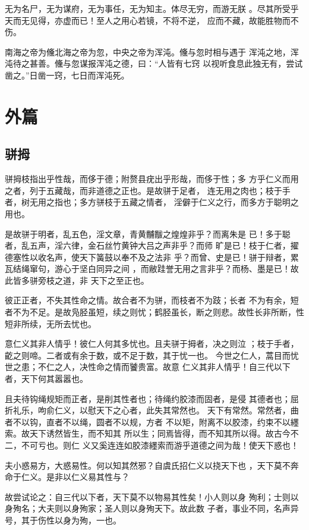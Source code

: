 \documentclass[12pt,UTF8]{ctexbook}
\begin{document}
无为名尸，无为谋府，无为事任，无为知主。体尽无穷，而游无朕 。尽其所受乎天而无见得，亦虚而已！至人之用心若镜，不将不逆， 应而不藏，故能胜物而不伤。

南海之帝为儵北海之帝为忽，中央之帝为浑沌。儵与忽时相与遇于 浑沌之地，浑沌待之甚善。儵与忽谋报浑沌之德，曰：“人皆有七窍 以视听食息此独无有，尝试凿之。”日凿一窍，七日而浑沌死。

\chapter{外篇}

\section{骈拇}

骈拇枝指出乎性哉，而侈于德；附赘县疣出乎形哉，而侈于性；多 方乎仁义而用之者，列于五藏哉，而非道德之正也。是故骈于足者， 连无用之肉也；枝于手者，树无用之指也；多方骈枝于五藏之情者， 淫僻于仁义之行，而多方于聪明之用也。

是故骈于明者，乱五色，淫文章，青黄黼黻之煌煌非乎？而离朱是 已！多于聪者，乱五声，淫六律，金石丝竹黄钟大吕之声非乎？而师 旷是已！枝于仁者，擢德塞性以收名声，使天下簧鼓以奉不及之法非 乎？而曾、史是已！骈于辩者，累瓦结绳窜句，游心于坚白同异之间 ，而敝跬誉无用之言非乎？而杨、墨是已！故此皆多骈旁枝之道，非 天下之至正也。

彼正正者，不失其性命之情。故合者不为骈，而枝者不为跂；长者 不为有余，短者不为不足。是故凫胫虽短，续之则忧；鹤胫虽长，断之则悲。故性长非所断，性短非所续，无所去忧也。

意仁义其非人情乎！彼仁人何其多忧也。且夫骈于拇者，决之则泣 ；枝于手者，齕之则啼。二者或有余于数，或不足于数，其于忧一也。 今世之仁人，蒿目而忧世之患；不仁之人，决性命之情而饕贵富。故意 仁义其非人情乎！自三代以下者，天下何其嚣嚣也。

且夫待钩绳规矩而正者，是削其性者也；待绳约胶漆而固者，是侵 其德者也；屈折礼乐，呴俞仁义，以慰天下之心者，此失其常然也。 天下有常然。常然者，曲者不以钩，直者不以绳，圆者不以规，方者 不以矩，附离不以胶漆，约束不以纆索。故天下诱然皆生，而不知其 所以生；同焉皆得，而不知其所以得。故古今不二，不可亏也。则仁 义又奚连连如胶漆纆索而游乎道德之间为哉！使天下惑也！

夫小惑易方，大惑易性。何以知其然邪？自虞氏招仁义以挠天下也 ，天下莫不奔命于仁义。是非以仁义易其性与？

故尝试论之：自三代以下者，天下莫不以物易其性矣！小人则以身 殉利；士则以身殉名；大夫则以身殉家；圣人则以身殉天下。故此数 子者，事业不同，名声异号，其于伤性以身为殉，一也。
\end{document}

